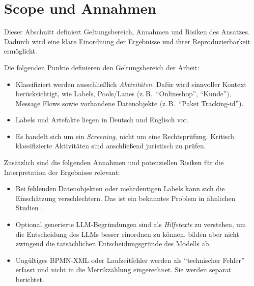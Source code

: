 \section{Scope und Annahmen}\label{sec:scope-und-annahmen}

Dieser Abschnitt definiert Geltungsbereich, Annahmen und Risiken des Ansatzes. Dadurch wird eine klare Einordnung der Ergebnisse und ihrer Reproduzierbarkeit ermöglicht.

Die folgenden Punkte definieren den Geltungsbereich der Arbeit:

\begin{itemize}
    \item Klassifiziert werden ausschließlich \emph{Aktivitäten}. Dafür wird sinnvoller Kontext berücksichtigt, wie Labels, Pools/Lanes (z.\,B.\ \enquote{Onlineshop}, \enquote{Kunde}), Message Flows sowie vorhandene Datenobjekte (z.\,B.\ \enquote{Paket Tracking-id}).
    \item Labels und Artefakte liegen in Deutsch und Englisch vor.
    \item Es handelt sich um ein \emph{Screening}, nicht um eine Rechtsprüfung. Kritisch klassifizierte Aktivitäten sind anschließend juristisch zu prüfen.
\end{itemize}

Zusätzlich sind die folgenden Annahmen und potenziellen Risiken für die Interpretation der Ergebnisse relevant:

\begin{itemize}
    \item Bei fehlenden Datenobjekten oder mehrdeutigen Labels kann sich die Einschätzung verschlechtern. Das ist ein bekanntes Problem in ähnlichen Studien \cite{nake2023towards}.
    \item Optional generierte \ac{LLM}-Begründungen sind als \emph{Hilfetexte} zu verstehen, um die Entscheidung des \acp{LLM} besser einordnen zu können, bilden aber nicht zwingend die tatsächlichen Entscheidungsgründe des Modells ab.
    \item Ungültiges \ac{BPMN}-XML oder Laufzeitfehler werden als \enquote{technischer Fehler} erfasst und nicht in die Metrikzählung eingerechnet. Sie werden separat berichtet.
\end{itemize}